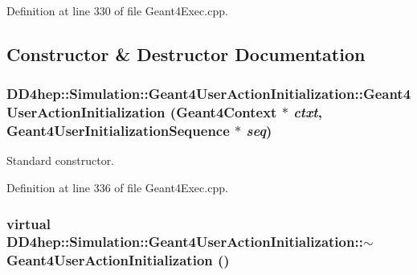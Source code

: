 Definition at line 330 of file Geant4Exec.cpp.

\subsection{Constructor \& Destructor Documentation}
\hypertarget{class_d_d4hep_1_1_simulation_1_1_geant4_user_action_initialization_ad5dad70e283015614959f397022c506a}{
\subsubsection[{Geant4UserActionInitialization}]{\setlength{\rightskip}{0pt plus 5cm}DD4hep::Simulation::Geant4UserActionInitialization::Geant4UserActionInitialization ({\bf Geant4Context} $\ast$ {\em ctxt}, \/  {\bf Geant4UserInitializationSequence} $\ast$ {\em seq})}}
\label{class_d_d4hep_1_1_simulation_1_1_geant4_user_action_initialization_ad5dad70e283015614959f397022c506a}


Standard constructor. 

Definition at line 336 of file Geant4Exec.cpp.\hypertarget{class_d_d4hep_1_1_simulation_1_1_geant4_user_action_initialization_a576b51911e71f7979dd327d8a76b1738}{
\subsubsection[{$\sim$Geant4UserActionInitialization}]{\setlength{\rightskip}{0pt plus 5cm}virtual DD4hep::Simulation::Geant4UserActionInitialization::$\sim$Geant4UserActionInitialization ()}}
\label{class_d_d4hep_1_1_simulation_1_1_geant4_user_action_initialization_a576b51911e71f7979dd327d8a76b1738}


